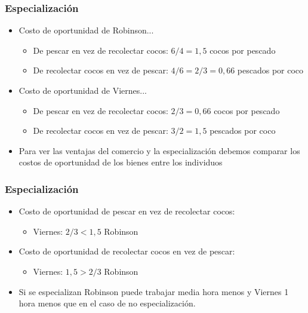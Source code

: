 \documentclass{beamer}
\begin{document}
\begin{frame}
\frametitle{Especialización}
\begin{itemize}
    \item Costo de oportunidad de Robinson...
        \begin{itemize}
        \item De pescar en vez de recolectar cocos: $ 6/4 = 1,5 $ cocos por pescado 
        \item De recolectar cocos en vez de pescar: $ 4/6 = 2/3=0,66 $ pescados por coco
        \end{itemize}
    \item Costo de oportunidad de Viernes...
        \begin{itemize}
        \item De pescar en vez de recolectar cocos: $ 2/3 = 0,66 $ cocos por pescado
        \item De recolectar cocos en vez de pescar: $ 3/2 = 1,5 $ pescados por coco
        \end{itemize}
    \item Para ver las ventajas del comercio y la especialización debemos comparar los costos de oportunidad de los bienes entre los individuos
\end{itemize}
\end{frame}

\begin{frame}
\frametitle{Especialización}
\begin{itemize}
    \item Costo de oportunidad de pescar en vez de recolectar cocos:
        \begin{itemize}
        \item Viernes: $ 2/3 < 1,5 $ Robinson 
        \end{itemize}
    \item Costo de oportunidad de recolectar cocos en vez de pescar:
        \begin{itemize}
        \item Viernes: $ 1,5 > 2/3 $ Robinson 
        \end{itemize}
    \item Si se especializan Robinson puede trabajar media hora menos y Viernes 1 hora menos que en el caso de no especialización. 
\end{itemize}
\end{frame}
\end{document}
